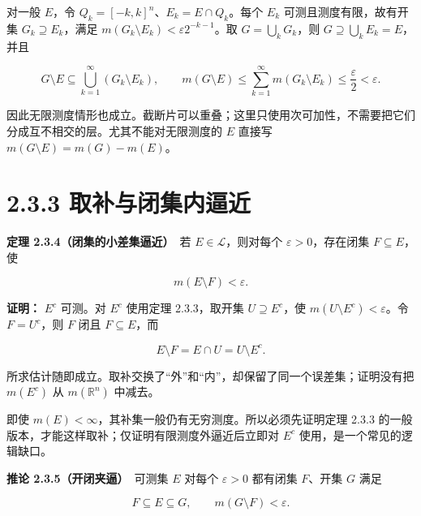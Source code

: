 \documentclass[11pt,a4paper]{article}
\begin{document}
对一般 \(E\)，令 \(Q_k=[-k,k]^n\)、\(E_k=E\cap Q_k\)。每个 \(E_k\)
可测且测度有限，故有开集 \(G_k\supseteq E_k\)，满足
\(m(G_k\setminus E_k)<\varepsilon2^{-k-1}\)。取 \(G=\bigcup_kG_k\)，则
\(G\supseteq\bigcup_kE_k=E\)，并且

\begin{equation*}
G\setminus E\subseteq\bigcup_{k=1}^{\infty}(G_k\setminus E_k),
\qquad m(G\setminus E)\le\sum_{k=1}^{\infty}m(G_k\setminus E_k)
\le\frac{\varepsilon}{2}<\varepsilon.
\tag{2.3.4}
\end{equation*}

因此无限测度情形也成立。截断片可以重叠；这里只使用次可加性，不需要把它们分成互不相交的层。尤其不能对无限测度的
\(E\) 直接写 \(m(G\setminus E)=m(G)-m(E)\)。

\section[\S{}2.3.3
取补与闭集内逼近]{2.3.3
取补与闭集内逼近}\label{ux53d6ux8865ux4e0eux95edux96c6ux5185ux903cux8fd1}

\textbf{定理 2.3.4（闭集的小差集逼近）}　若 \(E\in\mathcal L\)，则对每个
\(\varepsilon>0\)，存在闭集 \(F\subseteq E\)，使

\begin{equation*}
m(E\setminus F)<\varepsilon.
\tag{2.3.5}
\end{equation*}

\textbf{证明：} \(E^c\) 可测。对 \(E^c\) 使用定理 2.3.3，取开集
\(U\supseteq E^c\)，使 \(m(U\setminus E^c)<\varepsilon\)。令
\(F=U^c\)，则 \(F\) 闭且 \(F\subseteq E\)，而

\begin{equation*}
E\setminus F=E\cap U=U\setminus E^c.
\tag{2.3.6}
\end{equation*}

所求估计随即成立。取补交换了``外''和``内''，却保留了同一个误差集；证明没有把
\(m(E^c)\) 从 \(m(\mathbb R^n)\) 中减去。

即使 \(m(E)<\infty\)，其补集一般仍有无穷测度。所以必须先证明定理 2.3.3
的一般版本，才能这样取补；仅证明有限测度外逼近后立即对 \(E^c\)
使用，是一个常见的逻辑缺口。

\textbf{推论 2.3.5（开闭夹逼）}　可测集 \(E\) 对每个 \(\varepsilon>0\)
都有闭集 \(F\)、开集 \(G\) 满足

\begin{equation*}
F\subseteq E\subseteq G,\qquad m(G\setminus F)<\varepsilon.
\tag{2.3.7}
\end{equation*}
\end{document}
